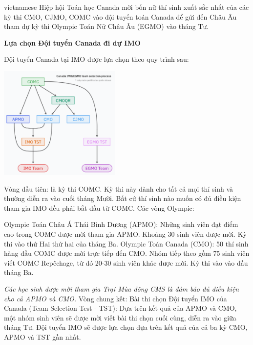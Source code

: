 \documentclass{article}
\begin{document}
\begin{otherlanguage*}{vietnamese}
Hiệp hội Toán học Canada mời bốn nữ thí sinh xuất sắc nhất của các kỳ thi CMO, CJMO, COMC vào đội tuyến toán Canada để gửi đến Châu Âu tham dự kỳ thi Olympic Toán Nữ Châu Âu (EGMO) vào tháng Tư.

\bigbreak
\textbf{Lựa chọn Đội tuyển Canada đi dự IMO}

Đội tuyển Canada tại IMO được lựa chọn theo quy trình sau:

\begin{center}
    \includegraphics[width=6cm]{./png/Canadian IMO EGMO selection process.png}
\end{center}

\begin{itemize}[topsep=0pt, partopsep=0pt, itemsep=0pt]
    \ii Vòng đầu tiên: là kỳ thi COMC. Kỳ thi này dành cho tất cả mọi thí sinh và thường diễn ra vào cuối tháng Mười. Bất cứ thí sinh nào muốn có đủ điều kiện tham gia IMO đều phải bắt đầu từ COMC.
    \ii Các vòng Olympic:
    \begin{itemize}[topsep=0pt, partopsep=0pt, itemsep=0pt]
        \ii Olympic Toán Châu Á Thái Bình Dương (APMO): Những sinh viên đạt điểm cao trong COMC được mời tham gia APMO. Khoảng 30 sinh viên được mời. Kỳ thi vào thứ Hai thứ hai của tháng Ba.
        \ii Olympic Toán Canada (CMO): 50 thí sinh hàng đầu COMC được mời trực tiếp đến CMO. Nhóm tiếp theo gồm 75 sinh viên viết COMC Repêchage, từ đó 20-30 sinh viên khác được mời. Kỳ thi vào vào đầu tháng Ba.
    \end{itemize}
    \textit{Các học sinh được mời tham gia Trại Mùa đông CMS là đảm bảo đủ điều kiện cho cả APMO và CMO.}
    \ii Vòng chung kết: Bài thi chọn Đội tuyển IMO của Canada (Team Selection Test - TST):
    Dựa trên kết quả của APMO và CMO, một nhóm sinh viên sẽ được mời viết bài thi chọn cuối cùng, diễn ra vào giữa tháng Tư.
    \ii Đội tuyển IMO sẽ được lựa chọn dựa trên kết quả của cả ba kỳ CMO, APMO và TST gần nhất.
\end{itemize}


\end{otherlanguage*}
\end{document}
